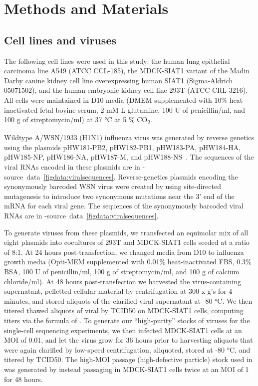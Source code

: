 \documentclass[9pt,lineno]{elife}
\begin{document}
\section{Methods and Materials}

\subsection{Cell lines and viruses}
The following cell lines were used in this study: the human lung epithelial carcinoma line A549 (ATCC CCL-185), the MDCK-SIAT1 variant of the Madin Darby canine kidney cell line overexpressing human SIAT1 (Sigma-Aldrich 05071502), and the human embryonic kidney cell line 293T (ATCC CRL-3216). 
All cells were maintained in D10 media (DMEM supplemented with 10\% heat-inactivated fetal bovine serum, 2 mM L-glutamine, 100 U of penicillin/ml, and 100 \si{\micro}g of streptomycin/ml) at 37 \si{\degreeCelsius} at 5 \% CO\textsubscript{2}.

Wildtype A/WSN/1933 (H1N1) influenza virus was generated by reverse genetics using the plasmids pHW181-PB2, pHW182-PB1, pHW183-PA, pHW184-HA, pHW185-NP, pHW186-NA, pHW187-M, and pHW188-NS~\citep{hoffmann2000dna}.
The sequences of the viral RNAs encoded in these plasmids are in -source~data~\ref{figdata:viralsequences}.
Reverse-genetics plasmids encoding the synonymously barcoded WSN virus were created by using site-directed mutagenesis to introduce two synonymous mutations near the 3' end of the mRNA for each viral gene.
The sequences of the synonymously barcoded viral RNAs are in -source~data~\ref{figdata:viralsequences}.

To generate viruses from these plasmids, we transfected an equimolar mix of all eight plasmids into cocultures of 293T and MDCK-SIAT1 cells seeded at a ratio of 8:1. 
At 24 hours post-transfection, we changed media from D10 to influenza growth media (Opti-MEM supplemented with 0.01\% heat-inactivated FBS, 0.3\% BSA, 100 U of penicillin/ml, 100  \si{\micro}g of streptomycin/ml, and 100 \si{\micro}g of calcium chloride/ml).
At 48 hours post-transfection we harvested the virus-containing supernatant, pelletted cellular material by centrifugation at 300 x g's for 4 minutes, and stored aliquots of the clarified viral supernatant at -80 \si{\degreeCelsius }. 
We then titered thawed aliquots of viral by TCID50 on MDCK-SIAT1 cells, computing titers via the formula of \citet{reed1938simple}.
To generate our ``high-purity'' stocks of viruses for the single-cell sequencing experiments, we then infected MDCK-SIAT1 cells at an MOI of 0.01, and let the virus grow for 36 hours prior to harvesting aliquots that were again clarified by low-speed centrifugation, aliquoted, stored at -80  \si{\degreeCelsius }, and titered by TCID50.
The high-MOI passage (high-defective particle) stock used in  was generated by instead passaging in MDCK-SIAT1 cells twice at an MOI of 1 for 48 hours.
\end{document}
